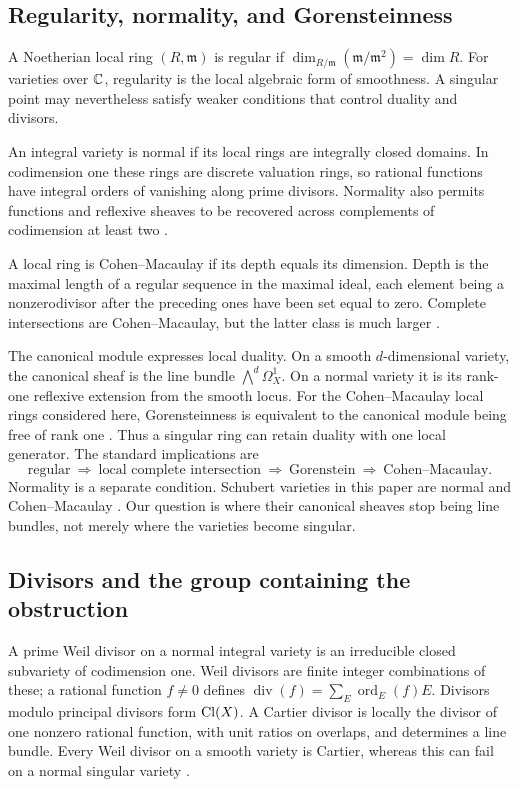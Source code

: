 \subsection{Regularity, normality, and Gorensteinness}
A Noetherian local ring $(R,\mathfrak m)$ is regular if $\dim_{R/\mathfrak m}(\mathfrak m/\mathfrak m^2)=\dim R$. For varieties over $\mathbb C$, regularity is the local algebraic form of smoothness. A singular point may nevertheless satisfy weaker conditions that control duality and divisors.

An integral variety is normal if its local rings are integrally closed domains. In codimension one these rings are discrete valuation rings, so rational functions have integral orders of vanishing along prime divisors. Normality also permits functions and reflexive sheaves to be recovered across complements of codimension at least two \cite[Chapter~II, Section~6]{Har77}\cite[Tags 031S, 0EBJ]{The26}.

A local ring is Cohen--Macaulay if its depth equals its dimension. Depth is the maximal length of a regular sequence in the maximal ideal, each element being a nonzerodivisor after the preceding ones have been set equal to zero. Complete intersections are Cohen--Macaulay, but the latter class is much larger \cite[Chapters~1--2]{BH93}.

The canonical module expresses local duality. On a smooth $d$-dimensional variety, the canonical sheaf is the line bundle $\bigwedge^d\Omega_X^1$. On a normal variety it is its rank-one reflexive extension from the smooth locus. For the Cohen--Macaulay local rings considered here, Gorensteinness is equivalent to the canonical module being free of rank one \cite[Chapter~3]{BH93}\cite[Tag 0DW9]{The26}. Thus a singular ring can retain duality with one local generator. The standard implications \cite[Tag 0AWV]{The26} are
\[
 \text{regular}\ \Longrightarrow\ \text{local complete intersection}
 \ \Longrightarrow\ \text{Gorenstein}
 \ \Longrightarrow\ \text{Cohen--Macaulay}.
\]
Normality is a separate condition. Schubert varieties in this paper are normal and Cohen--Macaulay \cite{Ram85,Bri05}. Our question is where their canonical sheaves stop being line bundles, not merely where the varieties become singular.

\subsection{Divisors and the group containing the obstruction}
A prime Weil divisor on a normal integral variety is an irreducible closed subvariety of codimension one. Weil divisors are finite integer combinations of these; a rational function $f\ne0$ defines $\operatorname{div}(f)=\sum_E\operatorname{ord}_E(f)E$. Divisors modulo principal divisors form $\operatorname{Cl}(X)$. A Cartier divisor is locally the divisor of one nonzero rational function, with unit ratios on overlaps, and determines a line bundle. Every Weil divisor on a smooth variety is Cartier, whereas this can fail on a normal singular variety \cite[Chapter~II, Section~6]{Har77}\cite{Fos73}.

